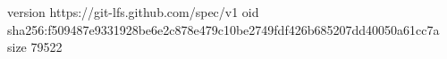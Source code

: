 version https://git-lfs.github.com/spec/v1
oid sha256:f509487e9331928be6e2c878e479c10be2749fdf426b685207dd40050a61cc7a
size 79522
